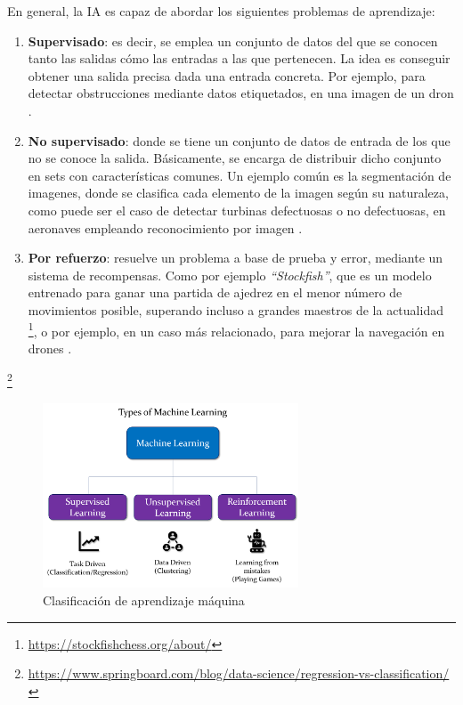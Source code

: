 En general, la \ac{IA} es capaz de abordar los siguientes problemas de aprendizaje:

\begin{enumerate}
	\item \textbf{Supervisado}: es decir, se emplea un conjunto de datos del que se conocen tanto las salidas cómo las entradas a las que pertenecen. La idea es conseguir obtener una salida precisa dada una entrada concreta. Por ejemplo, para detectar obstrucciones mediante datos etiquetados, en una imagen de un dron \cite{christl2020visionbased}.

	\item \textbf{No supervisado}: donde se tiene un conjunto de datos de entrada de los que no se conoce la salida. Básicamente, se encarga de distribuir dicho conjunto en sets con características comunes. Un ejemplo común es la segmentación de imagenes, donde se clasifica cada elemento de la imagen según su naturaleza, como puede ser el caso de detectar turbinas defectuosas o no defectuosas, en aeronaves empleando reconocimiento por imagen \cite{wang2019unsupervised}.
	
    \item \textbf{Por refuerzo}: resuelve un problema a base de prueba y error, mediante un sistema de recompensas. Como por ejemplo \emph{``Stockfish''}, que es un modelo entrenado para ganar una partida de ajedrez en el menor número de movimientos posible, superando incluso a grandes maestros de la actualidad \footnote[15]{\url{https://stockfishchess.org/about/}}, o por ejemplo, en un caso más relacionado, para mejorar la navegación en drones \cite{electronics10090999}.
\end{enumerate} \footnote[16]{\url{https://www.springboard.com/blog/data-science/regression-vs-classification/}}

\begin{figure} [H]
	\begin{center}
	\includegraphics[height=5.5cm]{imagenes/cap1/8_AI_types.png}
	\end{center}
	\caption[Clasificación de aprendizaje máquina]{Clasificación de aprendizaje máquina}
	\label{fig:ai_types}
\end{figure}

